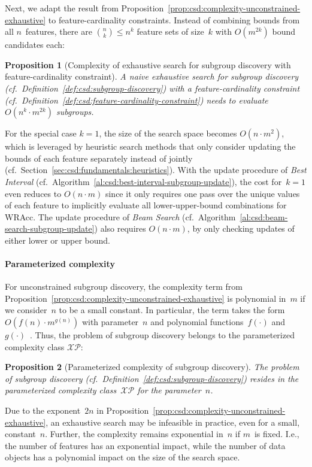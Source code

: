 \documentclass{article}
\newtheorem{proposition}{Proposition}
\theoremstyle{definition}
\begin{document}
Next, we adapt the result from Proposition~\ref{prop:csd:complexity-unconstrained-exhaustive} to feature-cardinality constraints.
Instead of combining bounds from all $n$~features, there are $\binom{n}{k} \leq n^k$ feature sets of size~$k$ with $O(m^{2k})$ bound candidates each:
%
\begin{proposition}[Complexity of exhaustive search for subgroup discovery with feature-cardinality constraint]
	A naive exhaustive search for subgroup discovery (cf.~Definition~\ref{def:csd:subgroup-discovery}) with a feature-cardinality constraint (cf.~Definition~\ref{def:csd:feature-cardinality-constraint}) needs to evaluate $O(n^k \cdot m^{2k})$ subgroups.
	\label{prop:csd:complexity-cardinality-exhaustive}
\end{proposition}
%
For the special case $k=1$, the size of the search space becomes $O(n \cdot m^2)$, which is leveraged by heuristic search methods that only consider updating the bounds of each feature separately instead of jointly (cf.~Section~\ref{sec:csd:fundamentals:heuristics}).
With the update procedure of \emph{Best Interval} (cf.~Algorithm~\ref{al:csd:best-interval-subgroup-update}), the cost for~$k=1$ even reduces to $O(n \cdot m)$ since it only requires one pass over the unique values of each feature to implicitly evaluate all lower-upper-bound combinations for WRAcc.
The update procedure of \emph{Beam Search} (cf.~Algorithm~\ref{al:csd:beam-search-subgroup-update}) also requires $O(n \cdot m)$, by only checking updates of either lower or upper bound.

\paragraph{Parameterized complexity}

For unconstrained subgroup discovery, the complexity term from Proposition~\ref{prop:csd:complexity-unconstrained-exhaustive} is polynomial in~$m$ if we consider~$n$ to be a small constant.
In particular, the term takes the form $O(f(n) \cdot m^{g(n)})$ with parameter~$n$ and polynomial functions~$f(\cdot)$ and~$g(\cdot)$~\cite{downey1997parameterized}.
Thus, the problem of subgroup discovery belongs to the parameterized complexity class $\mathcal{XP}$:
%
\begin{proposition}[Parameterized complexity of subgroup discovery]
	The problem of subgroup discovery (cf.~Definition~\ref{def:csd:subgroup-discovery}) resides in the parameterized complexity class~$\mathcal{XP}$ for the parameter~$n$.
	\label{prop:csd:complexity-unconstrained-xp}
\end{proposition}
%
Due to the exponent~$2n$ in Proposition~\ref{prop:csd:complexity-unconstrained-exhaustive}, an exhaustive search may be infeasible in practice, even for a small, constant~$n$.
Further, the complexity remains exponential in~$n$ if $m$~is fixed.
I.e., the number of features has an exponential impact, while the number of data objects has a polynomial impact on the size of the search space.
\end{document}
